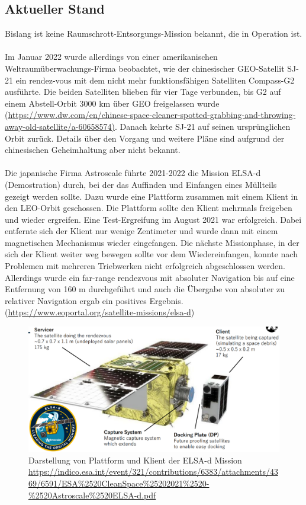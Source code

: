 \documentclass{article}
\begin{document}
\subsection{Aktueller Stand} \label{aktuell}
Bislang ist keine Raumschrott-Entsorgungs-Mission bekannt, die in Operation ist. \\\\
Im Januar 2022 wurde allerdings von einer amerikanischen Weltraumüberwachungs-Firma beobachtet, wie der chinesischer GEO-Satellit SJ-21 ein rendez-vous mit dem nicht mehr funktionsfähigen Satelliten Compass-G2 ausführte. Die beiden Satelliten blieben für vier Tage verbunden, bis G2 auf einem Abstell-Orbit 3000 km über GEO freigelassen wurde \href{https://www.dw.com/en/chinese-space-cleaner-spotted-grabbing-and-throwing-away-old-satellite/a-60658574}{(https://www.dw.com/en/chinese-space-cleaner-spotted-grabbing-and-throwing-away-old-satellite/a-60658574)}. Danach kehrte SJ-21 auf seinen ursprünglichen Orbit zurück. Details über den Vorgang und weitere Pläne sind aufgrund der chinesischen Geheimhaltung aber nicht bekannt. \\\\
Die japanische Firma Astroscale führte 2021-2022 die Mission ELSA-d (Demostration) durch, bei der das Auffinden und Einfangen eines Müllteils gezeigt werden sollte. Dazu wurde eine Plattform zusammen mit einem Klient in den LEO-Orbit geschossen. Die Plattform sollte den Klient mehrmals freigeben und wieder ergreifen. Eine Test-Ergreifung im August 2021 war erfolgreich. Dabei entfernte sich der Klient nur wenige Zentimeter und wurde dann mit einem magnetischen Mechanismus wieder eingefangen. Die nächste Missionphase, in der sich der Klient weiter weg bewegen sollte vor dem Wiedereinfangen, konnte nach Problemen mit mehreren Triebwerken nicht erfolgreich abgeschlossen werden. Allerdings wurde ein far-range rendezvous mit absoluter Navigation bis auf eine Entfernung von 160 m durchgeführt und auch die Übergabe von absoluter zu relativer Navigation ergab ein positives Ergebnis. (\href{https://www.eoportal.org/satellite-missions/elsa-d#mission-status}{https://www.eoportal.org/satellite-missions/elsa-d})
\begin{figure}[H]
	\centering
	\includegraphics[width=\linewidth]{bilder/ELSAd.png}
	\caption{Darstellung von Plattform und Klient der ELSA-d Mission \url{https://indico.esa.int/event/321/contributions/6383/attachments/4369/6591/ESA\%2520CleanSpace\%25202021\%2520-\%2520Astroscale\%2520ELSA-d.pdf}}
	\label{ELSAd}
\end{figure}
\end{document}
